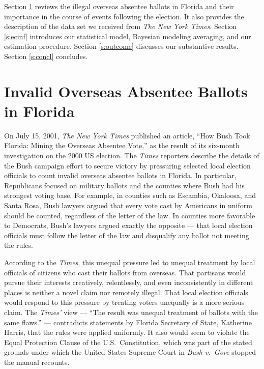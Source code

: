 \documentclass[11pt,titlepage]{article}
\begin{document}
Section \ref{s:ballots} reviews the illegal overseas absentee ballots
in Florida and their importance in the course of events following the
election. It also provides the description of the data set we received
from \textit{The New York Times}.  Section \ref{s:ecinf} introduces
our statistical model, Bayesian modeling averaging, and our estimation
procedure.  Section \ref{s:outcome} discusses our substantive results.
Section \ref{s:concl} concludes.

\section{Invalid Overseas Absentee Ballots in Florida} \label{s:ballots}

On July 15, 2001, \textit{The New York Times} published an article,
``How Bush Took Florida: Mining the Overseas Absentee Vote,'' as the
result of its six-month investigation on the 2000 US election.  The
\emph{Times} reporters describe the details of the Bush campaign
effort to secure victory by pressuring selected local election
officials to count invalid overseas absentee ballots in Florida.  In
particular, Republicans focused on military ballots and the counties
where Bush had his strongest voting base.  For example, in counties
such as Escambia, Okaloosa, and Santa Rosa, Bush lawyers argued that
every vote cast by Americans in uniform should be counted, regardless
of the letter of the law.  In counties more favorable to Democrats,
Bush's lawyers argued exactly the opposite --- that local election
officials must follow the letter of the law and disqualify any ballot
not meeting the rules.

According to the \emph{Times}, this unequal pressure led to unequal
treatment by local officials of citizens who cast their ballots from
overseas.  That partisans would pursue their interests creatively,
relentlessly, and even inconsistently in different places is neither a
novel claim nor remotely illegal.  That local election officials would
respond to this pressure by treating voters unequally is a more
serious claim.  The \emph{Times'} view --- ``The result was unequal
treatment of ballots with the same flaws.'' --- contradicts statements
by Florida Secretary of State, Katherine Harris, that the rules were
applied uniformly.  It also would seem to violate the Equal Protection
Clause of the U.S.\ Constitution, which was part of the stated grounds
under which the United States Supreme Court in \emph{Bush v.\ Gore}
stopped the manual recounts.
\end{document}
